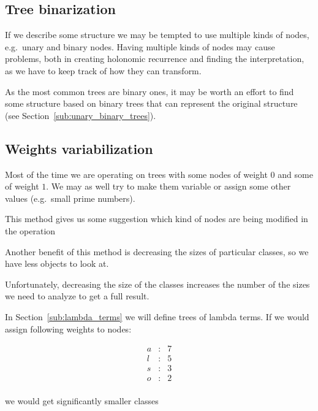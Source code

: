 \documentclass[final]{article}
\theoremstyle{definition}
\theoremstyle{remark}
\begin{document}
\subsection{Tree binarization}%
\label{sub:tree_binarization}

If we describe some structure we may be tempted to use multiple kinds of nodes, e.g.~unary and binary nodes. Having multiple kinds of nodes may cause problems, both in creating holonomic recurrence and finding the interpretation, as we have to keep track of how they can transform.

As the most common trees are binary ones, it may be worth an effort to find some structure based on binary trees that can represent the original structure (see Section~\ref{sub:unary_binary_trees}).

\subsection{Weights variabilization}%
\label{sub:weights_variablization}

Most of the time we are operating on trees with some nodes of weight \(0\) and some of weight \(1\). We may as well try to make them variable or assign some other values (e.g.\ small prime numbers).

This method gives us some suggestion which kind of nodes are being modified in the operation

Another benefit of this method is decreasing the sizes of particular classes, so we have less objects to look at.

Unfortunately, decreasing the size of the classes increases the number of the sizes we need to analyze to get a full result.

In Section~\ref{sub:lambda_terms} we will define trees of lambda terms. If we would assign following weights to nodes:

\[\begin{array}{rcl}
        a &:& 7\\
        l &:& 5\\
        s &:& 3\\
        o &:& 2\\
\end{array}\]

we would get significantly smaller classes
\end{document}
